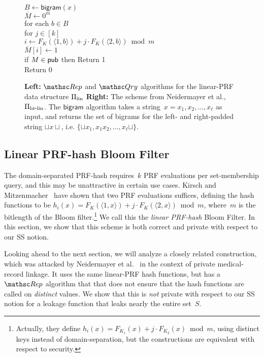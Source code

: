 \begin{figure}[tp]
{\medskip
{}\\
$B \gets \mathsf{bigram}(x)$\\
$\overline{M} \gets 0^m$\\
for each $b \in B$\\
\nudge for $j \in [k]$\\
\nudge\nudge $i \gets F_{K}(\langle 1,b \rangle)+j\cdot F_{K}(\langle 2,b \rangle) \bmod m$\\
\nudge\nudge $\overline{M}[i] \gets 1$\\
if $M \in {\sf pub}$ then Return 1 \\
Return 0
}
\caption{{\bf Left:} $\Rep$ and $\Qry$ algorithms for the linear-PRF
  data structure $\Pi_{\mathrm{lin}}$ {\bf Right:}
The scheme from Neidermayer et al.\cite{xxx}, $\Pi_{\mathrm{bi}\mbox{-}\mathrm{lin}}$. The $\mathsf{bigram}$
algorithm takes a string~$x=x_1,x_2,\ldots,x_\ell$ as input, and
returns the set of bigrams for the left- and right-padded string
$\sqcup x \sqcup$, i.e. $\{\sqcup x_1, x_1x_2,\ldots,x_\ell\sqcup\}$.
}
\label{fig:lin-and-bi-lin}
\label{fig:neidermayer}
\end{figure}

\subsection{Linear PRF-hash Bloom Filter }
The domain-separated PRF-hash requires~$k$ PRF evaluations per set-membership query, and this may be unattractive in certain use cases.  Kirsch and Mitzenmacher~\cite{xxx} have shown that two PRF evaluations suffices, defining the hash functions to be $h_i(x)=F_K(\langle 1,x \rangle) + j\cdot F_K(\langle 2,x \rangle) \bmod m$, where~$m$ is the bitlength of the Bloom filter.\footnote{Actually, they define $h_i(x)=F_{K_1}(x)  + j\cdot F_{K_2}(x) \bmod m$, using distinct keys instead of domain-separation, but the constructions are equivalent with respect to security.} We call this the \emph{linear PRF-hash} Bloom Filter.  In this section, we show that this scheme is both correct and private with respect to our SS notion.  

Looking ahead to the next section, we will analyze a closely related construction, which was attacked by Neidermayer et al.~\cite{xxx} in the context of private medical-record linkage.  It uses the same linear-PRF hash functions, but has a $\Rep$ algorithm that that does not ensure that the hash functions are called on \emph{distinct} values.  We show that this is \emph{not} private with respect to our SS notion for a leakage function that leaks nearly the entire set~$S$.   

